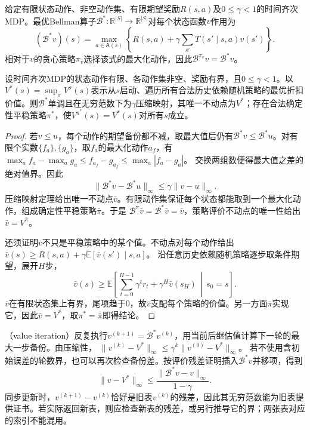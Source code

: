 \begin{definition}[最优Bellman算子]
 \label{def:rl-planning-optimal-operator}
 给定有限状态动作、非空动作集、有限期望奖励$R(s,a)$及$0\leq\gamma<1$的时间齐次MDP。最优Bellman算子$\mathcal B^*:\mathbb R^{|S|}\to\mathbb R^{|S|}$对每个状态函数$v$作用为
 \begin{equation}
 (\mathcal B^*v)(s)=\max_{a\in\mathsf A(s)}
 \left\{R(s,a)+\gamma\sum_{s'}T(s'\mid s,a)v(s')\right\}.
 \label{eq:rl-planning-optimal-operator}
 \end{equation}
 相对于$v$的贪心策略$\pi_v$选择该式的最大化动作，因此$\mathcal B^{\pi_v}v=\mathcal B^*v$。
\end{definition}

\begin{theorem}[最优不动点与平稳最优策略]
 \label{thm:rl-planning-optimal-fixed-point}
 设时间齐次MDP的状态动作有限、各动作集非空、奖励有界，且$0\leq\gamma<1$。以$V^*(s)=\sup_\sigma V^\sigma(s)$表示从$s$启动、遍历所有合法历史依赖随机策略的最优折扣价值。则$\mathcal B^*$单调且在无穷范数下为$\gamma$压缩映射，其唯一不动点为$V^*$；存在合法确定性平稳策略$\pi^*$，使$V^{\pi^*}(s)=V^*(s)$对所有$s$成立。
\end{theorem}
\begin{proof}
 若$v\leq u$，每个动作的期望备份都不减，取最大值后仍有$\mathcal B^*v\leq \mathcal B^*u$。对有限个实数$\{f_a\},\{g_a\}$，取$f_a$的最大化动作$a_f$，有
 $\max_a f_a-\max_a g_a\leq f_{a_f}-g_{a_f}\leq\max_a|f_a-g_a|$。
 交换两组数便得最大值之差的绝对值界。因此
 \[
 \lVert \mathcal B^*v-\mathcal B^*u\rVert_\infty
 \leq\gamma\lVert v-u\rVert_\infty.
 \]
 压缩映射定理给出唯一不动点$\bar v$。有限动作集保证每个状态都能取到一个最大化动作，组成确定性平稳策略$\bar\pi$。于是
 $\mathcal B^{\bar\pi}\bar v=\mathcal B^*\bar v=\bar v$，策略评价不动点的唯一性给出$\bar v=V^{\bar\pi}$。

 还须证明$\bar v$不只是平稳策略中的某个值。不动点对每个动作给出
 $\bar v(s)\geq R(s,a)+\gamma\mathbb E[\bar v(s')\mid s,a]$。
 沿任意历史依赖随机策略逐步取条件期望，展开$H$步，
 \[
 \bar v(s)\geq\mathbb E\!\left[
 \sum_{t=0}^{H-1}\gamma^t r_t+\gamma^H\bar v(s_H)
 \,\middle|\,s_0=s\right].
 \]
 $\bar v$在有限状态集上有界，尾项趋于0，故$\bar v$支配每个策略的价值。另一方面$\bar\pi$实现它，因此$\bar v=V^*$，取$\pi^*=\bar\pi$即得结论。
\end{proof}

（value iteration）反复执行$v^{(k+1)}=\mathcal B^*v^{(k)}$，用当前后继估值计算下一轮的最大一步备份。由压缩性，
$\lVert v^{(k)}-V^*\rVert_\infty\leq\gamma^k\lVert v^{(0)}-V^*\rVert_\infty$。
若不使用含初始误差的轮数界，也可以再次检查备份差。按评价残差证明插入$\mathcal B^*v$并移项，得到
\begin{equation}
 \lVert v-V^*\rVert_\infty
 \leq\frac{\lVert \mathcal B^*v-v\rVert_\infty}{1-\gamma}.
 \label{eq:rl-planning-optimal-residual}
\end{equation}
同步更新时，$v^{(k+1)}-v^{(k)}$恰好是旧表$v^{(k)}$的残差，因此其无穷范数能为旧表提供证书。若实际返回新表，则应检查新表的残差，或另行推导它的界；两张表对应的索引不能混用。

